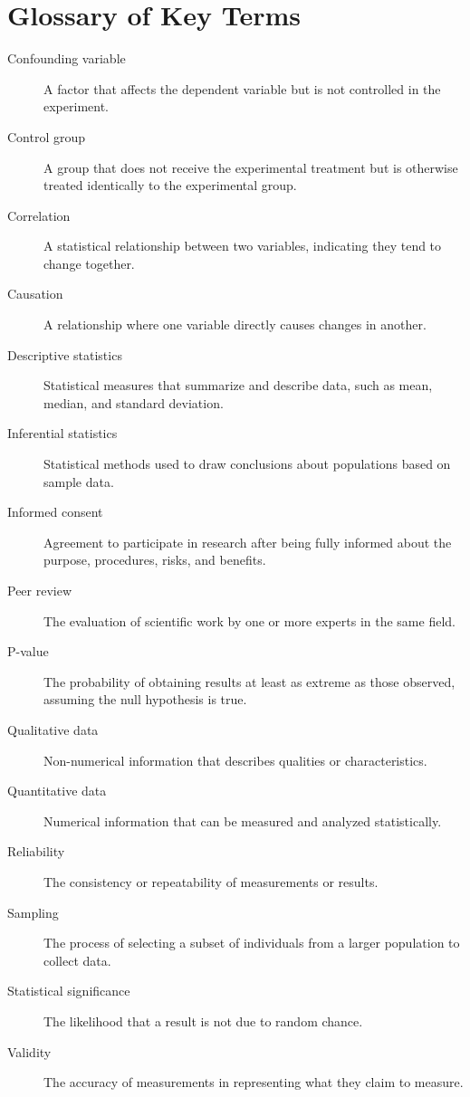 \section{Glossary of Key Terms}

\begin{description}
    \item[Confounding variable] A factor that affects the dependent variable but is not controlled in the experiment.
    \item[Control group] A group that does not receive the experimental treatment but is otherwise treated identically to the experimental group.
    \item[Correlation] A statistical relationship between two variables, indicating they tend to change together.
    \item[Causation] A relationship where one variable directly causes changes in another.
    \item[Descriptive statistics] Statistical measures that summarize and describe data, such as mean, median, and standard deviation.
    \item[Inferential statistics] Statistical methods used to draw conclusions about populations based on sample data.
    \item[Informed consent] Agreement to participate in research after being fully informed about the purpose, procedures, risks, and benefits.
    \item[Peer review] The evaluation of scientific work by one or more experts in the same field.
    \item[P-value] The probability of obtaining results at least as extreme as those observed, assuming the null hypothesis is true.
    \item[Qualitative data] Non-numerical information that describes qualities or characteristics.
    \item[Quantitative data] Numerical information that can be measured and analyzed statistically.
    \item[Reliability] The consistency or repeatability of measurements or results.
    \item[Sampling] The process of selecting a subset of individuals from a larger population to collect data.
    \item[Statistical significance] The likelihood that a result is not due to random chance.
    \item[Validity] The accuracy of measurements in representing what they claim to measure.
\end{description}

